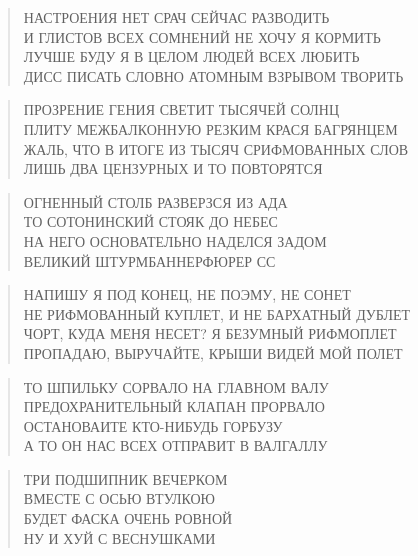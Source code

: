 \poemtitle{***}
\begin{verse}
НАСТРОЕНИЯ НЕТ СРАЧ СЕЙЧАС РАЗВОДИТЬ\\
И ГЛИСТОВ ВСЕХ СОМНЕНИЙ НЕ ХОЧУ Я КОРМИТЬ\\
ЛУЧШЕ БУДУ Я В ЦЕЛОМ ЛЮДЕЙ ВСЕХ ЛЮБИТЬ\\
ДИСС ПИСАТЬ СЛОВНО АТОМНЫМ ВЗРЫВОМ ТВОРИТЬ
\end{verse}

\poemtitle{***}
\begin{verse}
ПРОЗРЕНИЕ ГЕНИЯ СВЕТИТ ТЫСЯЧЕЙ СОЛНЦ\\
ПЛИТУ МЕЖБАЛКОННУЮ РЕЗКИМ КРАСЯ БАГРЯНЦЕМ\\
ЖАЛЬ, ЧТО В ИТОГЕ ИЗ ТЫСЯЧ СРИФМОВАННЫХ СЛОВ\\
ЛИШЬ ДВА ЦЕНЗУРНЫХ И ТО ПОВТОРЯТСЯ
\end{verse}

\poemtitle{***}
\begin{verse}
ОГНЕННЫЙ СТОЛБ РАЗВЕРЗСЯ ИЗ АДА\\
ТО СОТОНИНСКИЙ СТОЯК ДО НЕБЕС\\
НА НЕГО ОСНОВАТЕЛЬНО НАДЕЛСЯ ЗАДОМ\\
ВЕЛИКИЙ ШТУРМБАННЕРФЮРЕР СС
\end{verse}

\poemtitle{***}
\begin{verse}
НАПИШУ Я ПОД КОНЕЦ, НЕ ПОЭМУ, НЕ СОНЕТ\\
НЕ РИФМОВАННЫЙ КУПЛЕТ, И НЕ БАРХАТНЫЙ ДУБЛЕТ\\
ЧОРТ, КУДА МЕНЯ НЕСЕТ? Я БЕЗУМНЫЙ РИФМОПЛЕТ\\
ПРОПАДАЮ, ВЫРУЧАЙТЕ, КРЫШИ ВИДЕЙ МОЙ ПОЛЕТ
\end{verse}

\poemtitle{***}
\begin{verse}
ТО ШПИЛЬКУ СОРВАЛО НА ГЛАВНОМ ВАЛУ\\
ПРЕДОХРАНИТЕЛЬНЫЙ КЛАПАН ПРОРВАЛО\\
ОСТАНОВАИТЕ КТО-НИБУДЬ ГОРБУЗУ\\
А ТО ОН НАС ВСЕХ ОТПРАВИТ В ВАЛГАЛЛУ
\end{verse}

\poemtitle{***}
\begin{verse}
ТРИ ПОДШИПНИК ВЕЧЕРКОМ\\
ВМЕСТЕ С ОСЬЮ ВТУЛКОЮ\\
БУДЕТ ФАСКА ОЧЕНЬ РОВНОЙ\\
НУ И ХУЙ С ВЕСНУШКАМИ
\end{verse}

